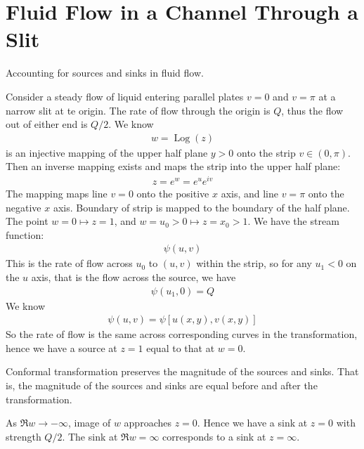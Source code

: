 \documentclass[12pt, english]{book}
\DeclareMathOperator\Log{Log}
\begin{document}
	\section{Fluid Flow in a Channel Through a Slit} \label{Fluid Flow in a Channel Through a Slit Section - Complex}
	
	Accounting for sources and sinks in fluid flow.
	
	Consider a steady flow of liquid entering parallel plates \(v = 0\) and \(v = \pi\) at a narrow slit at te origin. The rate of flow through the origin is \(Q\), thus the flow out of either end is \(Q/2\). We know 
	\begin{align*}
		w = \Log(z)
	\end{align*}
	is an injective mapping of the upper half plane \(y > 0\) onto the strip \(v \in (0,\pi)\). Then an inverse mapping exists and maps the strip into the upper half plane:
	\begin{align*}
		z = e^w = e^u e^{iv}
	\end{align*}
	The mapping maps line \(v = 0\) onto the positive \(x\) axis, and line \(v = \pi\) onto the negative \(x\) axis. Boundary of strip is mapped to the boundary of the half plane. The point \(w = 0 \mapsto z = 1\), and \(w = u_0 > 0 \mapsto z = x_0 > 1\). We have the stream function:
	\begin{align*}
		\psi(u,v)
	\end{align*} 
	This is the rate of flow across \(u_0\) to \((u,v)\) within the strip, so for any \(u_1 < 0\) on the \(u\) axis, that is the flow across the source, we have
	\begin{align*}
		\psi(u_1, 0) = Q
	\end{align*}
	We know
	\begin{align*}
		\psi(u,v) = \psi[u(x,y), v(x,y)]
	\end{align*}
	So the rate of flow is the same across corresponding curves in the transformation, hence we have a source at \(z=1\) equal to that at \(w =0\).
	
	\begin{corollary}
		Conformal transformation preserves the magnitude of the sources and sinks. That is, the magnitude of the sources and sinks are equal before and after the transformation.
	\end{corollary}

	As \(\Re{w} \rightarrow -\infty\), image of \(w\) approaches \(z=0\). Hence we have a sink at \(z = 0\) with strength \(Q/2\). The sink at \(\Re{w} = \infty\) corresponds to a sink at \(z = \infty\).
	
\end{document}
